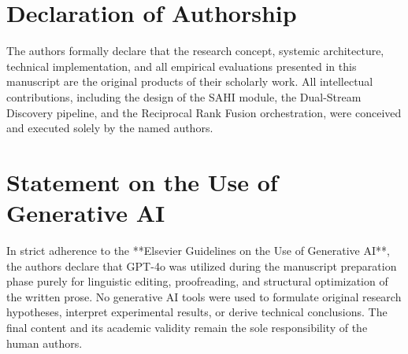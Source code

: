 \documentclass[a4paper,fleqn]{cas-dc}
\begin{document}
\section*{Declaration of Authorship}
The authors formally declare that the research concept, systemic architecture, technical implementation, and all empirical evaluations presented in this manuscript are the original products of their scholarly work. All intellectual contributions, including the design of the SAHI module, the Dual-Stream Discovery pipeline, and the Reciprocal Rank Fusion orchestration, were conceived and executed solely by the named authors.

\section*{Statement on the Use of Generative AI}
In strict adherence to the **Elsevier Guidelines on the Use of Generative AI**, the authors declare that GPT-4o was utilized during the manuscript preparation phase purely for linguistic editing, proofreading, and structural optimization of the written prose. No generative AI tools were used to formulate original research hypotheses, interpret experimental results, or derive technical conclusions. The final content and its academic validity remain the sole responsibility of the human authors.
\end{document}
